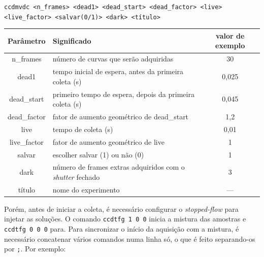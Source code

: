 			\begin{center}
				\texttt{ccdmvdc <n\_frames> <dead1> <dead\_start> <dead\_factor> <live>\\ <live\_factor> 	<salvar(0/1)> <dark> <título>}
			\end{center}

			\begin{table}[h]
				{\begin{tabular}{c p{} c}
					\toprule
					 Parâmetro   & \centering Significado                                                     & valor de exemplo \\ \midrule
					 n\_frames   & \centering número de curvas que serão adquiridas                           & 30               \\
					   dead1     & \centering tempo inicial de espera, antes da primeira coleta (s)           & 0,025            \\
					dead\_start  & \centering primeiro tempo de espera, depois da primeira coleta (s)         & 0,045            \\
					dead\_factor & \centering fator de aumento geométrico de dead\_start                      & 1,2              \\
					    live     & \centering tempo de coleta (s)                                             & 0,01             \\
					live\_factor & \centering fator de aumento geométrico de live                             & 1                \\
					   salvar    & \centering escolher salvar (1) ou não (0)                                  & 1                \\
					    dark     & \centering número de frames extras adquiridos com o \emph{shutter} fechado & 3                \\
					   título    & \centering nome do experimento                                             & ---              \\ \bottomrule
				\end{tabular}}%
			{}
			\end{table}
			
			Porém, antes de iniciar a coleta, é necessário configurar o \emph{stopped-flow} para injetar as soluções. O comando \texttt{ccdtfg 1 0 0} inicia a mistura das amostras e \texttt{ccdtfg 0 0 0} para. Para sincronizar o início da aquisição com a mistura, é necessário concatenar vários comandos numa linha só, o que é feito separando-os por \texttt{;}. Por exemplo:
			
